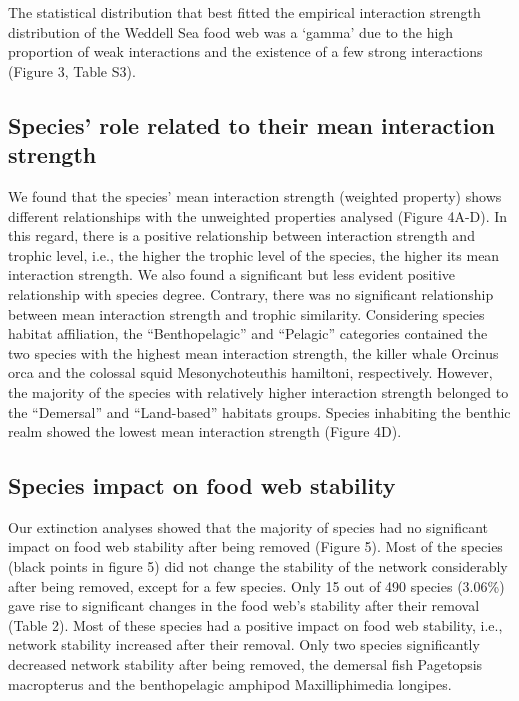 \documentclass[gc, manuscript]{copernicus}
\begin{document}
The statistical distribution that best fitted the empirical interaction
strength distribution of the Weddell Sea food web was a `gamma' due to
the high proportion of weak interactions and the existence of a few
strong interactions (Figure 3, Table S3).

\subsection{Species' role related to their mean interaction strength}

We found that the species' mean interaction strength (weighted property)
shows different relationships with the unweighted properties analysed
(Figure 4A-D). In this regard, there is a positive relationship between
interaction strength and trophic level, i.e., the higher the trophic
level of the species, the higher its mean interaction strength. We also
found a significant but less evident positive relationship with species
degree. Contrary, there was no significant relationship between mean
interaction strength and trophic similarity. Considering species habitat
affiliation, the ``Benthopelagic'' and ``Pelagic'' categories contained
the two species with the highest mean interaction strength, the killer
whale Orcinus orca and the colossal squid Mesonychoteuthis hamiltoni,
respectively. However, the majority of the species with relatively
higher interaction strength belonged to the ``Demersal'' and
``Land-based'' habitats groups. Species inhabiting the benthic realm
showed the lowest mean interaction strength (Figure 4D).

\subsection{Species impact on food web stability}

Our extinction analyses showed that the majority of species had no
significant impact on food web stability after being removed (Figure 5).
Most of the species (black points in figure 5) did not change the
stability of the network considerably after being removed, except for a
few species. Only 15 out of 490 species (3.06\%) gave rise to
significant changes in the food web's stability after their removal
(Table 2). Most of these species had a positive impact on food web
stability, i.e., network stability increased after their removal. Only
two species significantly decreased network stability after being
removed, the demersal fish Pagetopsis macropterus and the benthopelagic
amphipod Maxilliphimedia longipes.
\end{document}
